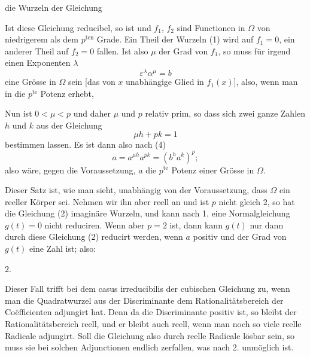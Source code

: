 die Wurzeln der Gleichung

Ist diese Gleichung reducibel, so ist
und $f_1$, $f_2$ sind Functionen in $\Omega$ von niedrigerem als dem $p^{\text{ten}}$ Grade.
Ein Theil der Wurzeln (1) wird auf $f_1 = 0$, ein anderer Theil auf $f_2 = 0$ fallen. Ist
also $\mu$ der Grad von $f_1$, so muss für irgend einen Exponenten $\lambda$
\[ \varepsilon^\lambda \alpha^\mu = b \]
eine Grösse in $\Omega$ sein [das von $x$ unabhängige Glied in $f_1(x)$], also, wenn man
in die $p^{\text{te}}$ Potenz erhebt,

Nun ist $0 < \mu < p$ und daher $\mu$ und $p$ relativ prim, so dass sich zwei ganze Zahlen
$h$ und $k$ aus der Gleichung
\[ \mu h + p k = 1 \]
bestimmen lassen. Es ist dann also nach (4)
\[ a = a^{\mu h} a^{p k} = (b^h a^k)^p; \]
also wäre, gegen die Voraussetzung, $a$ die $p^{\text{te}}$ Potenz einer Grösse in $\Omega$.

Dieser Satz ist, wie man sieht, unabhängig von der Voraussetzung, dass $\Omega$ ein
reeller Körper sei. Nehmen wir ihn aber reell an und ist $p$ nicht gleich 2, so hat die
Gleichung (2) imaginäre Wurzeln, und kann nach 1. eine Normalgleichung $g(t) = 0$ nicht
reduciren. Wenn aber $p = 2$ ist, dann kann $g(t)$ nur dann durch diese Gleichung (2)
reducirt werden, wenn $a$ positiv und der Grad von $g(t)$ eine  Zahl ist; also:

2.~

Dieser Fall trifft bei dem casus irreducibilis der cubischen Gleichung zu, wenn man die
Quadratwurzel aus der Discriminante dem Rationalitätsbereich der Co\"efficienten
adjungirt hat. Denn da die Discriminante positiv ist, so bleibt der Rationalitätsbereich
reell, und er bleibt auch reell, wenn man noch so viele reelle Radicale adjungirt. Soll
die Gleichung also durch reelle Radicale lösbar sein, so muss sie bei solchen
Adjunctionen endlich zerfallen, was nach 2. unmöglich ist.
